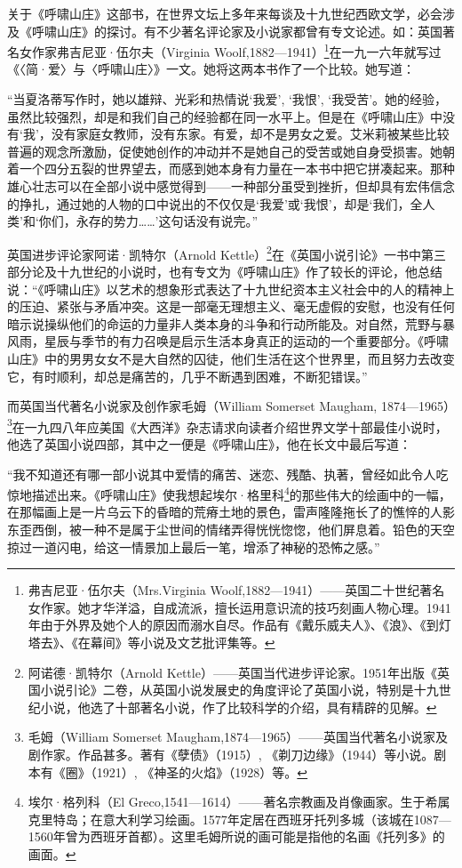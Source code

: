 \par 关于《呼啸山庄》这部书，在世界文坛上多年来每谈及十九世纪西欧文学，必会涉及《呼啸山庄》的探讨。有不少著名评论家及小说家都曾有专文论述。如：英国著名女作家弗吉尼亚·伍尔夫（Virginia Woolf,1882—1941）\footnote{弗吉尼亚·伍尔夫（Mrs.Virginia Woolf,1882—1941）——英国二十世纪著名女作家。她才华洋溢，自成流派，擅长运用意识流的技巧刻画人物心理。1941年由于外界及她个人的原因而溺水自尽。作品有《戴乐威夫人》、《浪》、《到灯塔去》、《在幕间》等小说及文艺批评集等。}在一九一六年就写过《〈简·爱〉与〈呼啸山庄〉》一文。她将这两本书作了一个比较。她写道：
\par “当夏洛蒂写作时，她以雄辩、光彩和热情说‘我爱’, ‘我恨’, ‘我受苦’。她的经验，虽然比较强烈，却是和我们自己的经验都在同一水平上。但是在《呼啸山庄》中没有‘我’，没有家庭女教师，没有东家。有爱，却不是男女之爱。艾米莉被某些比较普遍的观念所激励，促使她创作的冲动并不是她自己的受苦或她自身受损害。她朝着一个四分五裂的世界望去，而感到她本身有力量在一本书中把它拼凑起来。那种雄心壮志可以在全部小说中感觉得到——一种部分虽受到挫折，但却具有宏伟信念的挣扎，通过她的人物的口中说出的不仅仅是‘我爱’或‘我恨’，却是‘我们，全人类’和‘你们，永存的势力……’这句话没有说完。”
\par 英国进步评论家阿诺·凯特尔（Arnold Kettle）\footnote{阿诺德·凯特尔（Arnold Kettle）——英国当代进步评论家。1951年出版《英国小说引论》二卷，从英国小说发展史的角度评论了英国小说，特别是十九世纪小说，他选了十部著名小说，作了比较科学的介绍，具有精辟的见解。}在《英国小说引论》一书中第三部分论及十九世纪的小说时，也有专文为《呼啸山庄》作了较长的评论，他总结说：“《呼啸山庄》以艺术的想象形式表达了十九世纪资本主义社会中的人的精神上的压迫、紧张与矛盾冲突。这是一部毫无理想主义、毫无虚假的安慰，也没有任何暗示说操纵他们的命运的力量非人类本身的斗争和行动所能及。对自然，荒野与暴风雨，星辰与季节的有力召唤是启示生活本身真正的运动的一个重要部分。《呼啸山庄》中的男男女女不是大自然的囚徒，他们生活在这个世界里，而且努力去改变它，有时顺利，却总是痛苦的，几乎不断遇到困难，不断犯错误。”
\par 而英国当代著名小说家及创作家毛姆（William Somerset Maugham, 1874—1965）\footnote{毛姆（William Somerset Maugham,1874—1965）——英国当代著名小说家及剧作家。作品甚多。著有《孽债》（1915）, 《剃刀边缘》（1944）等小说。剧本有《圈》（1921）, 《神圣的火焰》（1928）等。}在一九四八年应美国《大西洋》杂志请求向读者介绍世界文学十部最佳小说时，他选了英国小说四部，其中之一便是《呼啸山庄》，他在长文中最后写道：
\par “我不知道还有哪一部小说其中爱情的痛苦、迷恋、残酷、执著，曾经如此令人吃惊地描述出来。《呼啸山庄》使我想起埃尔·格里科\footnote{埃尔·格列科（El Greco,1541—1614）——著名宗教画及肖像画家。生于希属克里特岛；在意大利学习绘画。1577年定居在西班牙托列多城（该城在1087—1560年曾为西班牙首都）。这里毛姆所说的画可能是指他的名画《托列多》的画面。}的那些伟大的绘画中的一幅，在那幅画上是一片乌云下的昏暗的荒瘠土地的景色，雷声隆隆拖长了的憔悴的人影东歪西倒，被一种不是属于尘世间的情绪弄得恍恍惚惚，他们屏息着。铅色的天空掠过一道闪电，给这一情景加上最后一笔，增添了神秘的恐怖之感。”
